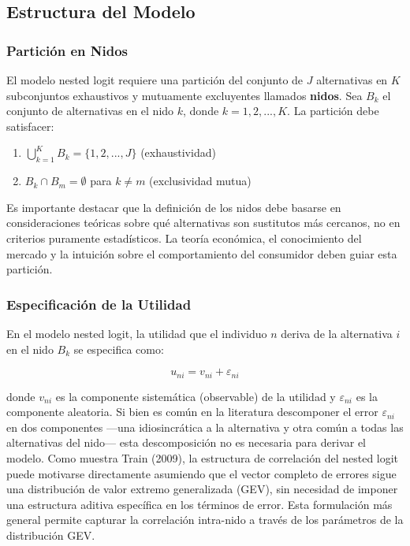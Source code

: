 \documentclass[
]{book}
\providecommand{\tightlist}{%
  \setlength{\itemsep}{0pt}\setlength{\parskip}{0pt}}
\begin{document}
\subsection{Estructura del Modelo}\label{estructura-del-modelo}

\subsubsection{Partición en Nidos}\label{particiuxf3n-en-nidos}

El modelo nested logit requiere una partición del conjunto de \(J\) alternativas en \(K\) subconjuntos exhaustivos y mutuamente excluyentes llamados \textbf{nidos}. Sea \(B_k\) el conjunto de alternativas en el nido \(k\), donde \(k = 1, 2, ..., K\). La partición debe satisfacer:

\begin{enumerate}
\def\labelenumi{\arabic{enumi}.}
\tightlist
\item
  \(\bigcup_{k=1}^K B_k = \{1, 2, ..., J\}\) (exhaustividad)
\item
  \(B_k \cap B_m = \emptyset\) para \(k \neq m\) (exclusividad mutua)
\end{enumerate}

Es importante destacar que la definición de los nidos debe basarse en consideraciones teóricas sobre qué alternativas son sustitutos más cercanos, no en criterios puramente estadísticos. La teoría económica, el conocimiento del mercado y la intuición sobre el comportamiento del consumidor deben guiar esta partición.

\subsubsection{Especificación de la Utilidad}\label{especificaciuxf3n-de-la-utilidad}

En el modelo nested logit, la utilidad que el individuo \(n\) deriva de la alternativa \(i\) en el nido \(B_k\) se especifica como:

\begin{equation}
u_{ni} = v_{ni} + \varepsilon_{ni}
\label{eq:nestedutil}
\end{equation}

donde \(v_{ni}\) es la componente sistemática (observable) de la utilidad y \(\varepsilon_{ni}\) es la componente aleatoria. Si bien es común en la literatura descomponer el error \(\varepsilon_{ni}\) en dos componentes ---una idiosincrática a la alternativa y otra común a todas las alternativas del nido--- esta descomposición no es necesaria para derivar el modelo. Como muestra Train (2009), la estructura de correlación del nested logit puede motivarse directamente asumiendo que el vector completo de errores sigue una distribución de valor extremo generalizada (GEV), sin necesidad de imponer una estructura aditiva específica en los términos de error. Esta formulación más general permite capturar la correlación intra-nido a través de los parámetros de la distribución GEV.
\end{document}
